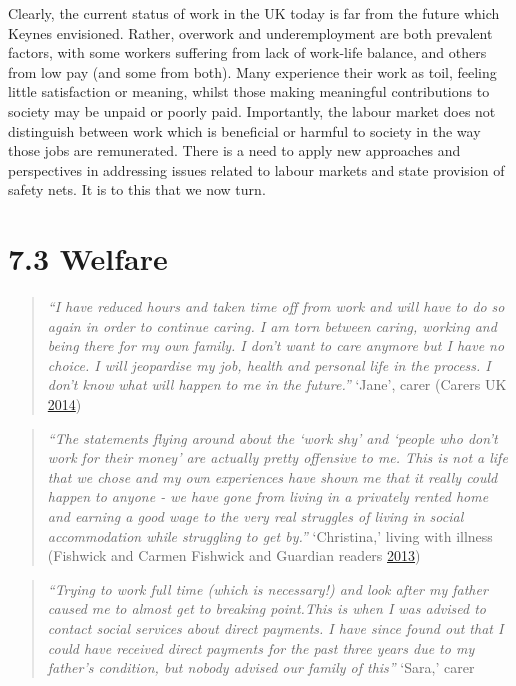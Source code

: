 \documentclass[]{tufte-handout}
\begin{document}
Clearly, the current status of work in the UK today is far from the
future which Keynes envisioned. Rather, overwork and underemployment are
both prevalent factors, with some workers suffering from lack of
work-life balance, and others from low pay (and some from both). Many
experience their work as toil, feeling little satisfaction or meaning,
whilst those making meaningful contributions to society may be unpaid or
poorly paid. Importantly, the labour market does not distinguish between
work which is beneficial or harmful to society in the way those jobs are
remunerated. There is a need to apply new approaches and perspectives in
addressing issues related to labour markets and state provision of
safety nets. It is to this that we now turn.

\hypertarget{welfare}{%
\section{7.3 Welfare}\label{welfare}}

\begin{quote}
\emph{``I have reduced hours and taken time off from work and will have
to do so again in order to continue caring. I am torn between caring,
working and being there for my own family. I don't want to care anymore
but I have no choice. I will jeopardise my job, health and personal life
in the process. I don't know what will happen to me in the future.''}
`Jane', carer (Carers UK \protect\hyperlink{ref-CarersUK2014}{2014})
\end{quote}

\begin{quote}
\emph{``The statements flying around about the `work shy' and `people
who don't work for their money' are actually pretty offensive to me.
This is not a life that we chose and my own experiences have shown me
that it really could happen to anyone - we have gone from living in a
privately rented home and earning a good wage to the very real struggles
of living in social accommodation while struggling to get by.''}
`Christina,' living with illness (Fishwick and Carmen Fishwick and
Guardian readers \protect\hyperlink{ref-Fishwick2013}{2013})
\end{quote}

\begin{quote}
\emph{``Trying to work full time (which is necessary!) and look after my
father caused me to almost get to breaking point.This is when I was
advised to contact social services about direct payments. I have since
found out that I could have received direct payments for the past three
years due to my father's condition, but nobody advised our family of
this''} `Sara,' carer
\end{quote}
\end{document}
